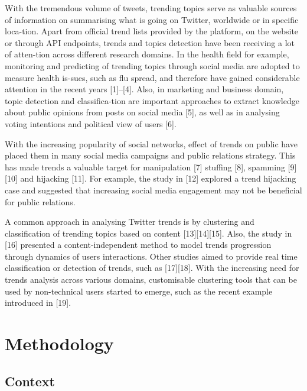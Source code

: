 \documentclass{llncs}
\begin{document}
With the tremendous volume of tweets, trending topics serve as
valuable sources of information on summarising what is going on
Twitter, worldwide or in specific loca-tion. Apart from official trend
lists provided by the platform, on the website or through API
endpoints, trends and topics detection have been receiving a lot of
atten-tion across different research domains. In the health field for
example, monitoring and predicting of trending topics through social
media are adopted to measure health is-sues, such as flu spread, and
therefore have gained considerable attention in the recent years
[1]–[4]. Also, in marketing and business domain, topic detection and
classifica-tion are important approaches to extract knowledge about
public opinions from posts on social media [5], as well as in
analysing voting intentions and political view of users [6].

With the increasing popularity of social networks, effect of trends on
public have placed them in many social media campaigns and public
relations strategy. This has made trends a valuable target for
manipulation [7] stuffing [8], spamming [9][10] and hijacking
[11]. For example, the study in [12] explored a trend hijacking case
and suggested that increasing social media engagement may not be
beneficial for public relations.

A common approach in analysing Twitter trends is by clustering and
classification of trending topics based on content [13][14][15]. Also,
the study in [16] presented a content-independent method to model
trends progression through dynamics of users interactions. Other
studies aimed to provide real time classification or detection of
trends, such as [17][18]. With the increasing need for trends analysis
across various domains, customisable clustering tools that can be used
by non-technical users started to emerge, such as the recent example
introduced in [19].


\section{Methodology}\label{method}

\subsection{Context}
\end{document}
